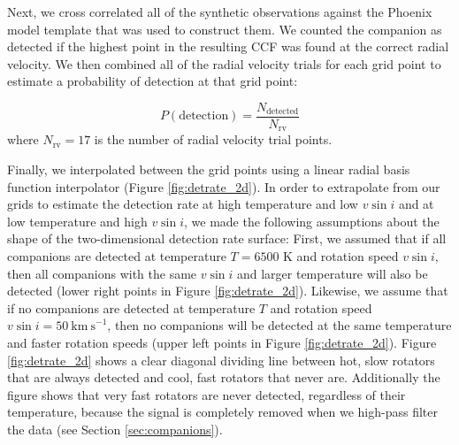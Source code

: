 \documentclass{emulateapj}
\begin{document}
Next, we cross correlated all of the synthetic observations against the Phoenix model template that was used to construct them. We counted the companion as detected if the highest point in the resulting CCF was found at the correct radial velocity. We then combined all of the radial velocity trials for each grid point to estimate a probability of detection at that grid point:

\begin{equation}
P(\mathrm{detection}) = \frac{N_\mathrm{detected}}{N_\mathrm{rv}}
\end{equation}
where $N_\mathrm{rv} = 17$ is the number of radial velocity trial points. 

Finally, we interpolated between the grid points using a linear radial basis function interpolator (Figure \ref{fig:detrate_2d}). In order to extrapolate from our grids to estimate the detection rate at high temperature and low $v\sin{i}$ and at low temperature and high $v\sin{i}$, we made the following assumptions about the shape of the two-dimensional detection rate surface: First, we assumed that if all companions are detected at temperature $T=6500$ K and rotation speed $v\sin{i}$, then all companions with the same $v\sin{i}$ and larger temperature will also be detected (lower right points in Figure \ref{fig:detrate_2d}). Likewise, we assume that if no companions are detected at temperature $T$ and rotation speed $v\sin{i} = 50\ \mathrm{km\ s}^{-1}$, then no companions will be detected at the same temperature and faster rotation speeds (upper left points in Figure \ref{fig:detrate_2d}). Figure \ref{fig:detrate_2d} shows a clear diagonal dividing line between hot, slow rotators that are always detected and cool, fast rotators that never are. Additionally the figure shows that very fast rotators are never detected, regardless of their temperature, because the signal is completely removed when we high-pass filter the data (see Section \ref{sec:companions}).
\end{document}
